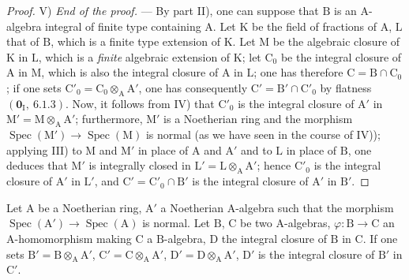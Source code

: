 \begin{proof}

V) \emph{End of the proof.} --- By part II), one can suppose that $\mathrm{B}$ is an $\mathrm{A}$-algebra
integral of finite type containing $\mathrm{A}$. Let $\mathrm{K}$ be the field of fractions of $\mathrm{A}$, $\mathrm{L}$ that of $\mathrm{B}$, which
is a finite type extension of $\mathrm{K}$. Let $\mathrm{M}$ be the algebraic closure of $\mathrm{K}$ in $\mathrm{L}$, which
is a \emph{finite} algebraic extension of $\mathrm{K}$; let $\mathrm{C}_0$ be the integral closure of $\mathrm{A}$ in $\mathrm{M}$,
which is also the integral closure of $\mathrm{A}$ in $\mathrm{L}$; one has therefore $\mathrm{C}=\mathrm{B}\cap\mathrm{C}_0$; if one sets
$\mathrm{C}'_0=\mathrm{C}_0\otimes_\mathrm{A}\mathrm{A}'$, one has consequently $\mathrm{C}'=\mathrm{B}'\cap\mathrm{C}'_0$ by flatness $(\mathbf{0}_\mathrm{I},~6.1.3)$. Now, it follows from IV)
that $\mathrm{C}'_0$ is the integral closure of $\mathrm{A}'$ in $\mathrm{M}'=\mathrm{M}\otimes_\mathrm{A}\mathrm{A}'$; furthermore, $\mathrm{M}'$ is a Noetherian
ring and the morphism $\operatorname{Spec}(\mathrm{M}')\to\operatorname{Spec}(\mathrm{M})$ is normal (as we have seen in the
course of IV)); applying III) to $\mathrm{M}$ and $\mathrm{M}'$ in place of $\mathrm{A}$ and $\mathrm{A}'$ and to $\mathrm{L}$ in place of $\mathrm{B}$, one deduces
that $\mathrm{M}'$ is integrally closed in $\mathrm{L}'=\mathrm{L}\otimes_\mathrm{A}\mathrm{A}'$; hence $\mathrm{C}'_0$ is the integral closure of $\mathrm{A}'$ in $\mathrm{L}'$,
and $\mathrm{C}'=\mathrm{C}'_0\cap\mathrm{B}'$ is the integral closure of $\mathrm{A}'$ in $\mathrm{B}'$.
\end{proof}

\begin{corollary}[6.14.5]
\label{IV.6.14.5}
Let $\mathrm{A}$ be a Noetherian ring, $\mathrm{A}'$ a Noetherian $\mathrm{A}$-algebra
such that the morphism $\operatorname{Spec}(\mathrm{A}')\to\operatorname{Spec}(\mathrm{A})$ is normal. Let $\mathrm{B}$, $\mathrm{C}$ be two $\mathrm{A}$-algebras, $\varphi:\mathrm{B}\to\mathrm{C}$
an $\mathrm{A}$-homomorphism making $\mathrm{C}$ a $\mathrm{B}$-algebra, $\mathrm{D}$ the integral closure of $\mathrm{B}$ in $\mathrm{C}$. If one
sets $\mathrm{B}'=\mathrm{B}\otimes_\mathrm{A}\mathrm{A}'$, $\mathrm{C}'=\mathrm{C}\otimes_\mathrm{A}\mathrm{A}'$, $\mathrm{D}'=\mathrm{D}\otimes_\mathrm{A}\mathrm{A}'$, $\mathrm{D}'$ is the integral closure of $\mathrm{B}'$ in $\mathrm{C}'$.
\end{corollary}

